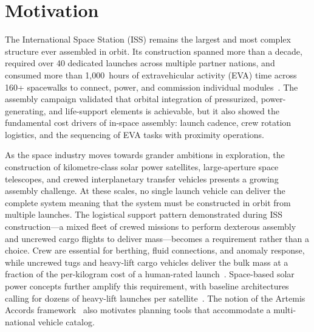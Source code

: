 \section{Motivation}

The International Space Station (ISS) remains the largest and most
complex structure ever assembled in orbit. Its construction spanned
more than a decade, required over 40 dedicated launches across
multiple partner nations, and consumed more than 1{,}000~hours of
extravehicular activity (EVA) time across 160+ spacewalks to
connect, power, and commission individual
modules~\cite{nasa_iss_assembly,iss_legacy,mcdonnell_iss_eva}. The
assembly campaign validated that orbital integration of
pressurized, power-generating, and life-support elements is
achievable, but it also showed the fundamental cost drivers
of in-space assembly: launch cadence, crew rotation logistics,
and the sequencing of EVA tasks with proximity operations.

As the space industry moves towards grander ambitions in exploration,
the construction of kilometre-class solar power satellites,
large-aperture space telescopes, and crewed interplanetary
transfer vehicles presents a growing assembly challenge. At these scales,
no single launch vehicle can deliver the complete system meaning that the system must
be constructed in orbit from multiple launches. The logistical support
pattern demonstrated during ISS construction---a mixed fleet of
crewed missions to perform dexterous assembly and uncrewed cargo
flights to deliver mass---becomes a requirement rather than a
choice. Crew are essential for berthing, fluid connections, and
anomaly response, while uncrewed tugs and heavy-lift cargo
vehicles deliver the bulk mass at a fraction of the per-kilogram
cost of a human-rated launch~\cite{wertz_larson}. Space-based
solar power concepts further amplify this requirement, with
baseline architectures calling for dozens of heavy-lift launches
per satellite~\cite{nsso_ssp}. The notion of the Artemis
Accords framework~\cite{artemis_accords} also motivates planning
tools that accommodate a multi-national vehicle catalog.

